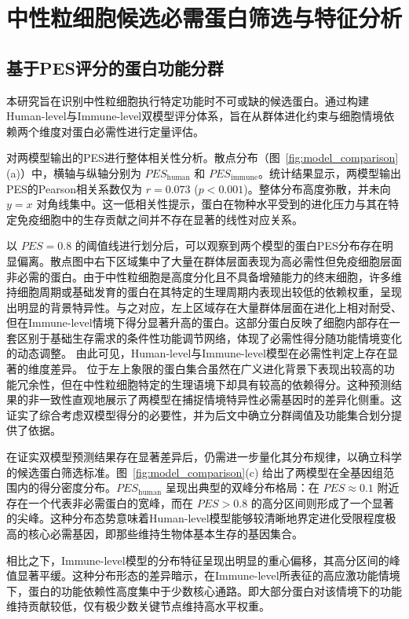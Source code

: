 
\chapter{中性粒细胞候选必需蛋白筛选与特征分析}

\section{基于PES评分的蛋白功能分群}

本研究旨在识别中性粒细胞执行特定功能时不可或缺的候选蛋白。通过构建Human-level与Immune-level双模型评分体系，旨在从群体进化约束与细胞情境依赖两个维度对蛋白必需性进行定量评估。

对两模型输出的PES进行整体相关性分析。散点分布（图~\ref{fig:model_comparison}(a)）中，横轴与纵轴分别为 $PES_{\text{human}}$ 和 $PES_{\text{immune}}$。统计结果显示，两模型输出PES的Pearson相关系数仅为 $r = 0.073$ ($p < 0.001$)。整体分布高度弥散，并未向 $y=x$ 对角线集中。这一低相关性提示，蛋白在物种水平受到的进化压力与其在特定免疫细胞中的生存贡献之间并不存在显著的线性对应关系。

以 $PES=0.8$ 的阈值线进行划分后，可以观察到两个模型的蛋白PES分布存在明显偏离。散点图中右下区域集中了大量在群体层面表现为高必需性但免疫细胞层面非必需的蛋白。由于中性粒细胞是高度分化且不具备增殖能力的终末细胞，许多维持细胞周期或基础发育的蛋白在其特定的生理周期内表现出较低的依赖权重，呈现出明显的背景特异性。与之对应，左上区域存在大量群体层面在进化上相对耐受、但在Immune-level情境下得分显著升高的蛋白。这部分蛋白反映了细胞内部存在一套区别于基础生存需求的条件性功能调节网络，体现了必需性得分随功能情境变化的动态调整。
由此可见，Human-level与Immune-level模型在必需性判定上存在显著的维度差异。
位于左上象限的蛋白集合虽然在广义进化背景下表现出较高的功能冗余性，但在中性粒细胞特定的生理语境下却具有较高的依赖得分。这种预测结果的非一致性直观地展示了两模型在捕捉情境特异性必需基因时的差异化侧重。这证实了综合考虑双模型得分的必要性，并为后文中确立分群阈值及功能集合划分提供了依据。

在证实双模型预测结果存在显著差异后，仍需进一步量化其分布规律，以确立科学的候选蛋白筛选标准。图~\ref{fig:model_comparison}(c) 给出了两模型在全基因组范围内的得分密度分布。$PES_{\text{human}}$ 呈现出典型的双峰分布格局：在 $PES \approx 0.1$ 附近存在一个代表非必需蛋白的宽峰，而在 $PES > 0.8$ 的高分区间则形成了一个显著的尖峰。这种分布态势意味着Human-level模型能够较清晰地界定进化受限程度极高的核心必需基因，即那些维持生物体基本生存的基因集合。

相比之下，Immune-level模型的分布特征呈现出明显的重心偏移，其高分区间的峰值显著平缓。这种分布形态的差异暗示，在Immune-level所表征的高应激功能情境下，蛋白的功能依赖性高度集中于少数核心通路。即大部分蛋白对该情境下的功能维持贡献较低，仅有极少数关键节点维持高水平权重。

